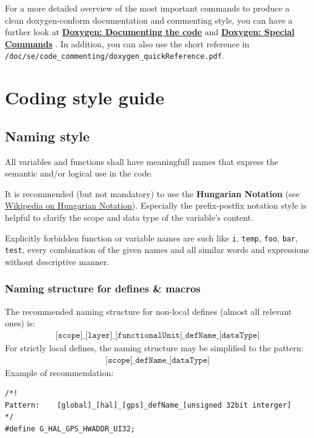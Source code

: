 For a more detailed overview of the most important commands to produce a clean doxygen-conform documentation and commenting style, you can have a further look at 
\textbf{
\href{http://www.stack.nl/~dimitri/doxygen/manual/docblocks.html}{Doxygen: Documenting the code} 
}
and 
\textbf{
\href{http://www.stack.nl/~dimitri/doxygen/manual/commands.html}{Doxygen: Special Commands}
}. 
In addition, you can also use the short reference in \texttt{/doc/se/code\_commenting/doxygen\_quickReference.pdf}.
\chapter{Coding style guide}
\label{sec:style}

\section{Naming style}
\label{sec:style:varNaming}
All variables and functions shall have meaningfull names that express the semantic and/or logical use in the code.

It is recommended (but not mandatory) to use the \textbf{Hungarian Notation} (see \href{http://en.wikipedia.org/wiki/Hungarian_notation#Examples}{Wikipedia on Hungarian Notation}). Especially the prefix-postfix notation style is helpful to clarify the scope and data type of the variable's content.

Explicitly forbidden function or variable names are such like \texttt{i}, \texttt{temp}, \texttt{foo}, \texttt{bar}, \texttt{test}, every combination of the given names and all similar words and expressions without descriptive manner.

\subsection{Naming structure for defines \& macros}
\label{sec:style:varNaming:def}

The recommended naming structure for non-local defines (almost all relevant ones) is:
\begin{align}
\texttt{[scope]\_[layer]\_[functionalUnit]\_defName\_[dataType]}
\label{eqn:style:namingStructure}
\end{align}
For strictly local defines, the naming structure may be simplified to the pattern:
\begin{align}
\texttt{[scope]\_defName\_[dataType]}
\label{eqn:style:namingStructure}
\end{align}
Example of recommendation:
\begin{lstlisting}
/*! 
Pattern: 	[global]_[hal]_[gps]_defName_[unsigned 32bit interger] 
*/
#define G_HAL_GPS_HWADDR_UI32;
\end{lstlisting}

